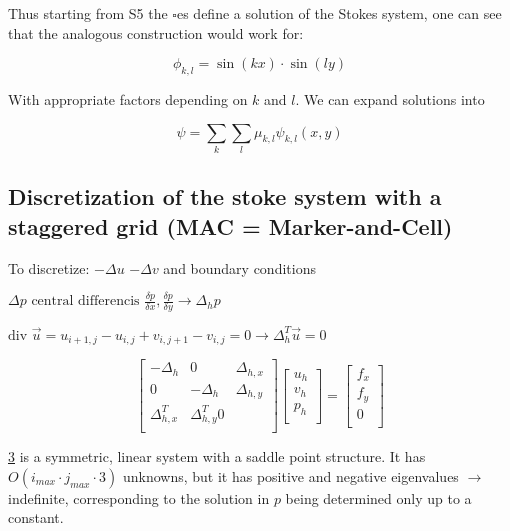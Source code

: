 Thus starting from S5 %
the $\square$es define a solution of the Stokes system, one can see that the analogous construction would work for:
\begin{figure}[H]
	\centering
	\[ \phi_{k,l} = \sin(kx) \cdot \sin(ly)\]
	\renewcommand{\thefigure}{S12}
	\caption{}
	\label{fig:disc-freesplipb}
\end{figure}
With appropriate factors depending on $k$ and $l$. We can expand solutions into
\begin{figure}[H]
	\centering
	\[ \psi = \sum_k \sum_l \mu_{k,l} \psi_{k,l}(x,y)\]
	\renewcommand{\thefigure}{S13}
	\caption{}
	\label{fig:disc-freesplipb}
\end{figure}

\subsection*{Discretization of the stoke system with a staggered grid (MAC = Marker-and-Cell)}
To discretize:
$- \Delta u$%
$- \Delta v$%
and boundary conditions

$\Delta p \text{ central differencis } \frac{\delta p}{\delta x}, \frac{\delta p}{\delta y} \rightarrow \Delta_h p$

$\text{div }\vec{u} = u_{i+1,j} - u_{i,j} +v_{i,j+1} - v_{i,j} = 0 \rightarrow \Delta_h^T \vec{u} = 0$

\begin{figure}[H]
	\centering
	\[ \left[ \begin{matrix}
	-\Delta_h & 0 & \Delta_{h,x} \\
	0 & -\Delta_h & \Delta_{h,y} \\
	\Delta_{h,x}^T & \Delta_{h,y}^T 0\\
	\end{matrix} \right] 
	\left[
	\begin{matrix}
	u_h \\
	v_h \\
	p_h\\
	\end{matrix} \right] = \left[ \begin{matrix}
	f_x \\ f_y \\ 0 \\
	\end{matrix} \right] \]%
	\renewcommand{\thefigure}{S14} %
	\caption{}
	\label{fig:disc-stokes}
\end{figure}
\ref{fig:disc-stokes} is a symmetric, linear system with a saddle point structure. It has $O(i_{max}\cdot j_{max}\cdot 3)$ unknowns, but it has positive and negative eigenvalues $\rightarrow$ indefinite, corresponding to the solution in $p$ being determined only up to a constant.

